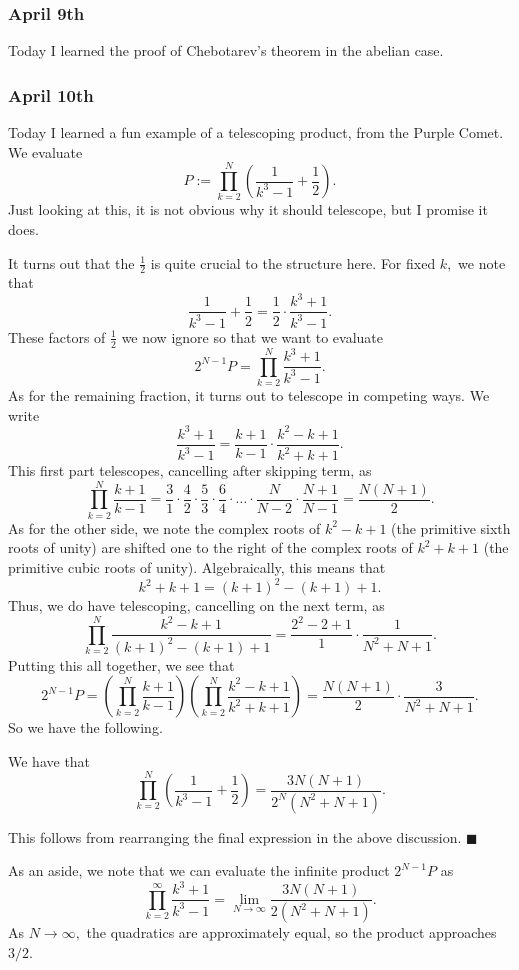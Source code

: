 \subsubsection{April 9th}
Today I learned the proof of Chebotarev's theorem in the abelian case. \todo{}

\subsubsection{April 10th}
Today I learned a fun example of a telescoping product, from the Purple Comet. We evaluate
\[P:=\prod_{k=2}^N\left(\frac1{k^3-1}+\frac12\right).\]
Just looking at this, it is not obvious why it should telescope, but I promise it does.

It turns out that the $\frac12$ is quite crucial to the structure here. For fixed $k,$ we note that
\[\frac1{k^3-1}+\frac12=\frac12\cdot\frac{k^3+1}{k^3-1}.\]
These factors of $\frac12$ we now ignore so that we want to evaluate
\[2^{N-1}P=\prod_{k=2}^N\frac{k^3+1}{k^3-1}.\]
As for the remaining fraction, it turns out to telescope in competing ways. We write
\[\frac{k^3+1}{k^3-1}=\frac{k+1}{k-1}\cdot\frac{k^2-k+1}{k^2+k+1}.\]
This first part telescopes, cancelling after skipping term, as
\[\prod_{k=2}^N\frac{k+1}{k-1}=\frac31\cdot\frac42\cdot\frac53\cdot\frac64\cdot\ldots\cdot\frac N{N-2}\cdot\frac{N+1}{N-1}=\frac{N(N+1)}2.\]
As for the other side, we note the complex roots of $k^2-k+1$ (the primitive sixth roots of unity) are shifted one to the right of the complex roots of $k^2+k+1$ (the primitive cubic roots of unity). Algebraically, this means that
\[k^2+k+1=(k+1)^2-(k+1)+1.\]
Thus, we do have telescoping, cancelling on the next term, as
\[\prod_{k=2}^N\frac{k^2-k+1}{(k+1)^2-(k+1)+1}=\frac{2^2-2+1}1\cdot\frac1{N^2+N+1}.\]
Putting this all together, we see that
\[2^{N-1}P=\left(\prod_{k=2}^N\frac{k+1}{k-1}\right)\left(\prod_{k=2}^N\frac{k^2-k+1}{k^2+k+1}\right)=\frac{N(N+1)}2\cdot\frac3{N^2+N+1}.\]
So we have the following.
\begin{proposition}
    We have that
    \[\prod_{k=2}^N\left(\frac1{k^3-1}+\frac12\right)=\frac{3N(N+1)}{2^N\left(N^2+N+1\right)}.\]
\end{proposition}
This follows from rearranging the final expression in the above discussion. $\blacksquare$

As an aside, we note that we can evaluate the infinite product $2^{N-1}P$ as
\[\prod_{k=2}^\infty\frac{k^3+1}{k^3-1}=\lim_{N\to\infty}\frac{3N(N+1)}{2\left(N^2+N+1\right)}.\]
As $N\to\infty,$ the quadratics are approximately equal, so the product approaches $\boxed{3/2}.$

